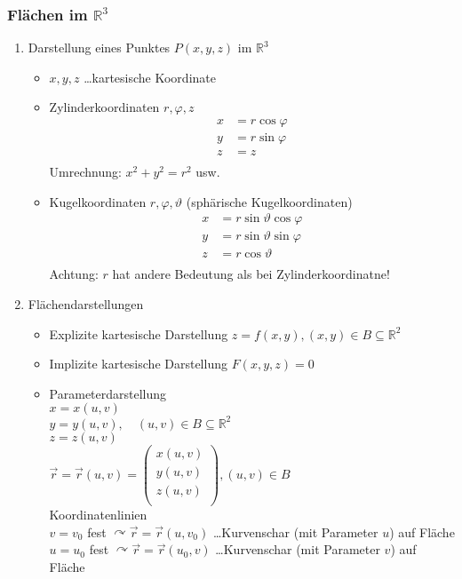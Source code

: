 \documentclass[a4paper]{scrartcl}
\begin{document}
\subsubsection{Flächen im $\mathbb{R}^3$}
\begin{enumerate}
\item Darstellung eines Punktes $P(x,y,z)$ im $\mathbb{R}^3$
\begin{itemize}
\item $x,y,z$ \dots kartesische Koordinate
\item Zylinderkoordinaten $r,\varphi,z$\\
\begin{align*}
x & =  r \cos{\varphi}\\
y & =  r \sin{\varphi} \\
z & =  z \\
\end{align*}
Umrechnung: $x^2+y^2 = r^2$ usw.
\item Kugelkoordinaten $r,\varphi,\vartheta$ (sphärische Kugelkoordinaten)
\begin{align*}
x & = r \sin{\vartheta} \cos{\varphi}\\
y & = r \sin{\vartheta} \sin{\varphi}\\
z & = r \cos{\vartheta}\\
\end{align*}
Achtung: $r$ hat andere Bedeutung als bei Zylinderkoordinatne!
\end{itemize}
\item Flächendarstellungen
\begin{itemize}
\item Explizite kartesische Darstellung $z=f(x,y), (x,y) \in B \subseteq \mathbb{R}^2$
\item Implizite kartesische Darstellung $F(x,y,z) = 0$
\item Parameterdarstellung\\
$x=x(u,v)$\\
$y=y(u,v), \quad (u,v) \in B \subseteq \mathbb{R}^2$\\
$z=z(u,v)$\\
$\vec{r} = \vec{r}(u,v) = \begin{pmatrix} x(u,v) \\ y(u,v) \\ z(u,v)\\ \end{pmatrix}, (u,v) \in B$\\


Koordinatenlinien\\
$v=v_0$ fest $\curvearrowright \vec{r} = \vec{r} (u,v_0)$ \dots Kurvenschar (mit Parameter $u$) auf Fläche\\
$u=u_0$ fest $\curvearrowright \vec{r} = \vec{r}(u_0,v)$ \dots Kurvenschar (mit Parameter $v$) auf Fläche\\


\end{itemize}
\end{enumerate}
\end{document}
